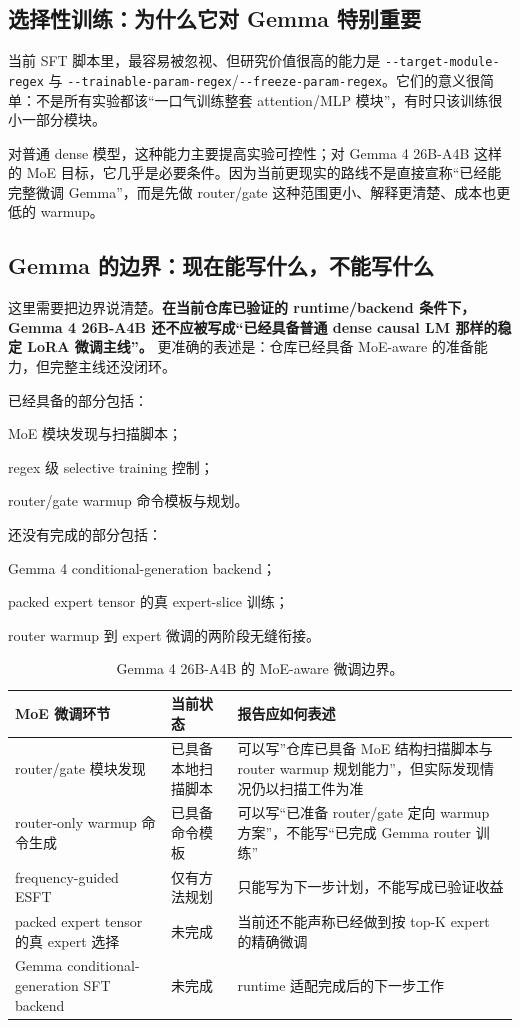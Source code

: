 \documentclass[11pt,a4paper]{article}
\newcommand{\code}[1]{\begingroup\ttfamily\footnotesize\nolinkurl{#1}\endgroup}
\begin{document}
\subsection{选择性训练：为什么它对 Gemma 特别重要}

当前 SFT 脚本里，最容易被忽视、但研究价值很高的能力是 \code{--target-module-regex} 与 \code{--trainable-param-regex}/\code{--freeze-param-regex}。它们的意义很简单：不是所有实验都该“一口气训练整套 attention/MLP 模块”，有时只该训练很小一部分模块。

对普通 dense 模型，这种能力主要提高实验可控性；对 Gemma 4 26B-A4B 这样的 MoE 目标，它几乎是必要条件。因为当前更现实的路线不是直接宣称“已经能完整微调 Gemma”，而是先做 router/gate 这种范围更小、解释更清楚、成本也更低的 warmup。

\subsection{Gemma 的边界：现在能写什么，不能写什么}

这里需要把边界说清楚。\textbf{在当前仓库已验证的 runtime/backend 条件下，Gemma 4 26B-A4B 还不应被写成“已经具备普通 dense causal LM 那样的稳定 LoRA 微调主线”。} 更准确的表述是：仓库已经具备 MoE-aware 的准备能力，但完整主线还没闭环。

已经具备的部分包括：

  \par MoE 模块发现与扫描脚本；
  \par regex 级 selective training 控制；
  \par router/gate warmup 命令模板与规划。

还没有完成的部分包括：

  \par Gemma 4 conditional-generation backend；
  \par packed expert tensor 的真 expert-slice 训练；
  \par router warmup 到 expert 微调的两阶段无缝衔接。

\begin{table}[htbp]
\centering
\small
\begin{tabularx}{\textwidth}{p{3.1cm} p{2.4cm} Y}
\toprule
MoE 微调环节 & 当前状态 & 报告应如何表述 \\
\midrule
router/gate 模块发现 & 已具备本地扫描脚本 & 可以写”仓库已具备 MoE 结构扫描脚本与 router warmup 规划能力”，但实际发现情况仍以扫描工件为准 \\
router-only warmup 命令生成 & 已具备命令模板 & 可以写“已准备 router/gate 定向 warmup 方案”，不能写“已完成 Gemma router 训练” \\
frequency-guided ESFT & 仅有方法规划 & 只能写为下一步计划，不能写成已验证收益 \\
packed expert tensor 的真 expert 选择 & 未完成 & 当前还不能声称已经做到按 top-K expert 的精确微调 \\
Gemma conditional-generation SFT backend & 未完成 & runtime 适配完成后的下一步工作 \\
\bottomrule
\end{tabularx}
\caption{Gemma 4 26B-A4B 的 MoE-aware 微调边界。}
\label{tab:gemma-moe-boundary}
\end{table}
\end{document}

